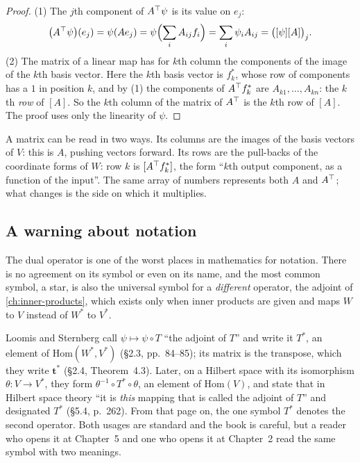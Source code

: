 \begin{notechapter}
\begin{proof}
(1) The $j$th component of $A^{\top}\psi$ is its value on $e_j$:
\[
  \bigl(A^{\top}\psi\bigr)(e_j) = \psi(Ae_j)
  = \psi\Bigl(\sum_iA_{ij}f_i\Bigr) = \sum_i\psi_iA_{ij}
  = \bigl([\psi][A]\bigr)_j .
\]
(2) The matrix of a linear map has for $k$th column the components of the
image of the $k$th basis vector. Here the $k$th basis vector is $f_k^*$,
whose row of components has a $1$ in position $k$, and by (1) the
components of $A^{\top}f_k^*$ are $A_{k1},\dots,A_{kn}$: the $k$th
\emph{row} of $[A]$. So the $k$th column of the matrix of $A^{\top}$ is the
$k$th row of $[A]$. The proof uses only the linearity of $\psi$.
\end{proof}

\begin{intuition}
A matrix can be read in two ways. Its columns are the images of the basis
vectors of $V$: this is $A$, pushing vectors forward. Its rows are the
pull-backs of the coordinate forms of $W$: row $k$ is
$[A^{\top}f_k^*]$, the form ``$k$th output component, as a function of the
input''. The same array of numbers represents both $A$ and $A^{\top}$;
what changes is the side on which it multiplies.
\end{intuition}

\subsection{A warning about notation}\label{duality:sec:notation}

The dual operator is one of the worst places in mathematics for notation.
There is no agreement on its symbol or even on its name, and the most
common symbol, a star, is also the universal symbol for a \emph{different}
operator, the adjoint of \cref{ch:inner-products}, which exists only when
inner products are given and maps $W$ to $V$ instead of $W^*$ to $V^*$.

\begin{pitfall}
Loomis and Sternberg call $\psi\mapsto\psi\circ T$ ``the adjoint of $T$''
and write it $T^*$, an element of $\mathrm{Hom}(W^*, V^*)$ (\S2.3,
pp.~84--85); its matrix is the transpose, which they write $\mathbf t^*$
(\S2.4, Theorem~4.3). Later, on a Hilbert space with its isomorphism
$\theta:V\to V^*$, they form $\theta^{-1}\circ T^*\circ\theta$, an element
of $\mathrm{Hom}(V)$, and state that in Hilbert space theory ``it is
\emph{this} mapping that is called the adjoint of $T$'' and designated
$T^*$ (\S5.4, p.~262). From that page on, the one symbol $T^*$ denotes the
second operator. Both usages are standard and the book is careful, but a
reader who opens it at Chapter~5 and one who opens it at Chapter~2 read
the same symbol with two meanings.
\end{pitfall}


\end{notechapter}
